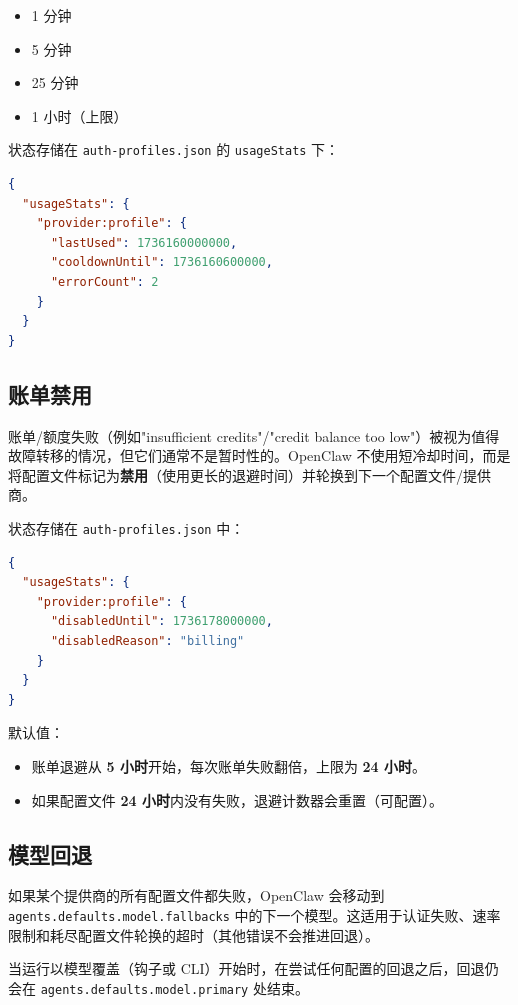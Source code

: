 \begin{itemize}
  \item 1 分钟
  \item 5 分钟
  \item 25 分钟
  \item 1 小时（上限）
\end{itemize}


状态存储在 \texttt{auth-profiles.json} 的 \texttt{usageStats} 下：

\begin{lstlisting}[language=json]
{
  "usageStats": {
    "provider:profile": {
      "lastUsed": 1736160000000,
      "cooldownUntil": 1736160600000,
      "errorCount": 2
    }
  }
}
\end{lstlisting}


\subsection{账单禁用}


账单/额度失败（例如"insufficient credits"/"credit balance too low"）被视为值得故障转移的情况，但它们通常不是暂时性的。OpenClaw 不使用短冷却时间，而是将配置文件标记为\textbf{禁用}（使用更长的退避时间）并轮换到下一个配置文件/提供商。

状态存储在 \texttt{auth-profiles.json} 中：

\begin{lstlisting}[language=json]
{
  "usageStats": {
    "provider:profile": {
      "disabledUntil": 1736178000000,
      "disabledReason": "billing"
    }
  }
}
\end{lstlisting}


默认值：

\begin{itemize}
  \item 账单退避从 \textbf{5 小时}开始，每次账单失败翻倍，上限为 \textbf{24 小时}。
  \item 如果配置文件 \textbf{24 小时}内没有失败，退避计数器会重置（可配置）。
\end{itemize}


\subsection{模型回退}


如果某个提供商的所有配置文件都失败，OpenClaw 会移动到 \texttt{agents.defaults.model.fallbacks} 中的下一个模型。这适用于认证失败、速率限制和耗尽配置文件轮换的超时（其他错误不会推进回退）。

当运行以模型覆盖（钩子或 CLI）开始时，在尝试任何配置的回退之后，回退仍会在 \texttt{agents.defaults.model.primary} 处结束。

